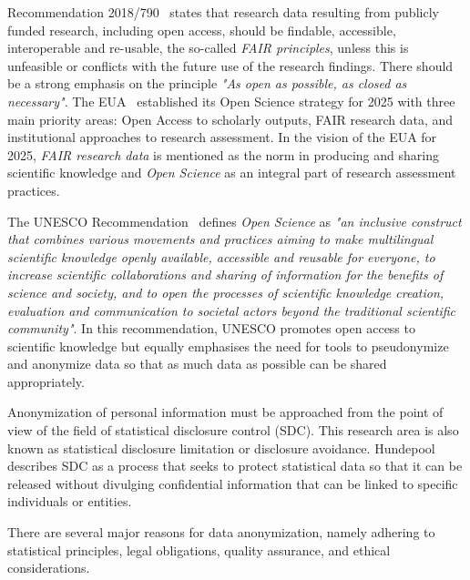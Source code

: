 \documentclass{article}
\begin{document}
Recommendation 2018/790~\cite{2018_EU_2018/790} states that research data resulting from publicly funded research, including open access, should be findable, accessible, interoperable and re-usable, the so-called \textit{FAIR principles}, unless this is unfeasible or conflicts with the future use of the research findings. There should be a strong emphasis on the principle \textit{"As open as possible, as closed as necessary"}. 
The EUA~\cite{2022_EUA} established its Open Science strategy for 2025 with three main priority areas: Open Access to scholarly outputs, FAIR research data, and institutional approaches to research assessment. In the vision of the EUA for 2025, \textit{FAIR research data} is mentioned as the norm in producing and sharing scientific knowledge and \textit{Open Science} as an integral part of research assessment practices.

The UNESCO Recommendation~\cite{2021_UNESCO} defines \textit{Open Science} as \textit{"an
inclusive construct that combines various movements and practices aiming
to make multilingual scientific knowledge openly available, accessible and
reusable for everyone, to increase scientific collaborations and sharing of
information for the benefits of science and society, and to open the processes of scientific knowledge creation, evaluation and communication to societal actors beyond the traditional scientific community"}. In this recommendation, UNESCO promotes open access to scientific knowledge but equally emphasises the need for tools to pseudonymize and anonymize data so that as much data as possible can be shared appropriately.
\newline

Anonymization of personal information must be approached from the point of view of the field of statistical disclosure control (SDC). This research area is also known as statistical disclosure limitation or disclosure avoidance.
Hundepool~\cite{2012_Hundepool} describes SDC as a process that seeks to protect statistical data so that it can be released without divulging confidential information that can be linked to specific individuals or entities.

There are several major reasons for data anonymization, namely adhering to statistical principles, legal obligations, quality assurance, and ethical considerations. 
\end{document}
